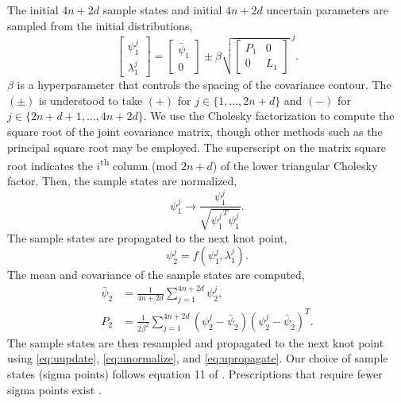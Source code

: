The initial $4n + 2d$ sample states and initial $4n + 2d$
uncertain parameters are sampled from the initial distributions,
\begin{equation}\label{eq:uupdate}
  \begin{bmatrix} \psi_{1}^{j} \\ \lambda_{1}^{j} \end{bmatrix} =
  \begin{bmatrix} \bar{\psi}_{1} \\ 0\end{bmatrix}
    \pm \beta \sqrt{\begin{bmatrix} P_{1} & 0\\ 0 & L_{1}\end{bmatrix}}^{\; j}.
\end{equation}
$\beta$ is a hyperparameter that controls the spacing of the covariance contour.
The $(\pm)$ is understood to take $(+)$ for $j \in \{1, \dots, 2n + d\}$ and $(-)$ for
$j \in \{2n + d + 1, \dots, 4n + 2d\}$. We use the Cholesky factorization
to compute the square root of the
joint covariance matrix, though other methods
such as the principal square root may be employed.
The superscript on the matrix square root indicates the $i$\textsuperscript{th}
column (mod $2n + d$) of the lower triangular Cholesky factor.
Then, the sample states are normalized,
\begin{equation}\label{eq:unormalize}
  \psi_{1}^{j} \rightarrow \frac{\psi_{1}^{j}}{\sqrt{{\psi_{1}^{j}}^{T} \psi_{1}^{j}}}.
\end{equation}
The sample states are propagated to the next knot point,
\begin{equation}\label{eq:upropagate}
  \psi^{j}_{2} = f(\psi^{j}_{1}, \lambda^{j}_{1}).
\end{equation}
The mean and covariance of the sample states are computed,
\begin{align}
  \bar{\psi}_{2} &= \frac{1}{4n + 2d} \sum_{j = 1}^{4n + 2d} \psi_{2}^{j},\\
  P_{2} &= \frac{1}{2 \beta^{2}} \sum_{j = 1}^{4n + 2d}
  (\psi^{j}_{2} - \bar{\psi}_{2})(\psi^{j}_{2} - \bar{\psi}_{2})^{T}.
\end{align}
The sample states are then resampled and propagated to the next knot point using
\eqref{eq:uupdate}, \eqref{eq:unormalize}, and \eqref{eq:upropagate}. Our
choice of sample states (sigma points) follows equation 11 of
\cite{julier2004unscented}.
Prescriptions that require fewer sigma points exist \cite{julier2002reduced}.





